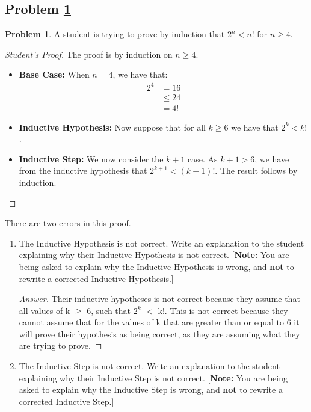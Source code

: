 \documentclass[11pt]{article}
\theoremstyle{definition}
\theoremstyle{definition}
\newtheorem{required}{Problem}
\theoremstyle{definition}
\begin{document}
\subsection{Problem \ref{Induction1}}
\begin{required} \label{Induction1}
A student is trying to prove by induction that $2^{n} < n!$ for $n \geq 4$. 

\begin{proof}[Student's Proof]
The proof is by induction on $n \geq 4$. 
\begin{itemize}
\item \textbf{Base Case:} When $n = 4$, we have that:
\begin{align*}
2^{4} &= 16 \\
&\leq 24 \\
&= 4!
\end{align*}

\item \textbf{Inductive Hypothesis:} Now suppose that for all $k \geq 6$ we have that $2^{k} < k!$. 

\item \textbf{Inductive Step:} We now consider the $k+1$ case. As $k+1 > 6$, we have from the inductive hypothesis that $2^{k+1} < (k+1)!$. The result follows by induction.
\end{itemize}
\end{proof}

There are two errors in this proof. 
\begin{enumerate}[label=(\alph*)]
\item The Inductive Hypothesis is not correct. Write an explanation to the student explaining why their Inductive Hypothesis is not correct. [\textbf{Note:} You are being asked to explain why the Inductive Hypothesis is wrong, and \textbf{not} to rewrite a corrected Inductive Hypothesis.]


\begin{proof}[Answer]
Their inductive hypotheses is not correct because they assume that all values of k  $\ge$ 6, such that $2^k$ $< $ k!. This is not correct because they cannot assume that for the values of k that are greater than or equal to 6 it will prove their hypothesis as being correct, as they are assuming what they are trying to prove.
\end{proof}



\vskip 15pt
\item The Inductive Step is not correct. Write an explanation to the student explaining why their Inductive Step is not correct. [\textbf{Note:} You are being asked to explain why the Inductive Step is wrong, and \textbf{not} to rewrite a corrected Inductive Step.]


\end{enumerate}
\end{required}
\end{document}
